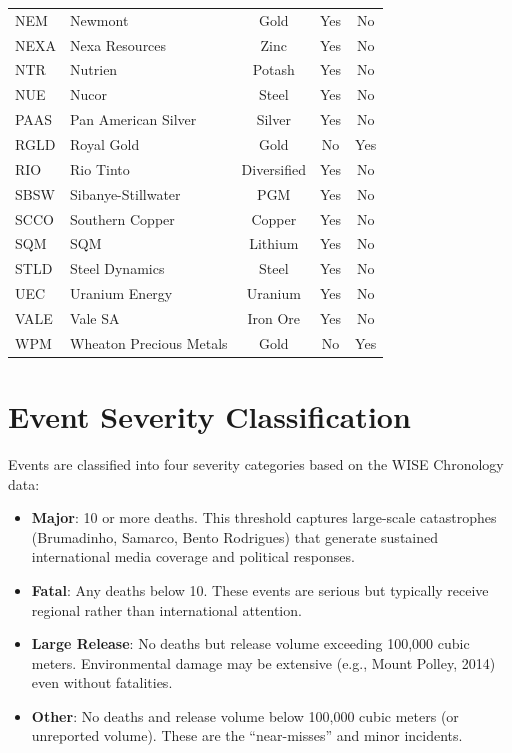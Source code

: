 \documentclass[12pt]{article}
\begin{document}
\begin{table}[htbp]
\begin{tabular}{llccc}
NEM & Newmont & Gold & Yes & No \\
NEXA & Nexa Resources & Zinc & Yes & No \\
NTR & Nutrien & Potash & Yes & No \\
NUE & Nucor & Steel & Yes & No \\
PAAS & Pan American Silver & Silver & Yes & No \\
RGLD & Royal Gold & Gold & No & Yes \\
RIO & Rio Tinto & Diversified & Yes & No \\
SBSW & Sibanye-Stillwater & PGM & Yes & No \\
SCCO & Southern Copper & Copper & Yes & No \\
SQM & SQM & Lithium & Yes & No \\
STLD & Steel Dynamics & Steel & Yes & No \\
UEC & Uranium Energy & Uranium & Yes & No \\
VALE & Vale SA & Iron Ore & Yes & No \\
WPM & Wheaton Precious Metals & Gold & No & Yes \\
\bottomrule
\end{tabular}
\end{table}

\section{Event Severity Classification}\label{app:severity}

Events are classified into four severity categories based on the WISE Chronology data:

\begin{itemize}
\item \textbf{Major}: 10 or more deaths. This threshold captures large-scale catastrophes (Brumadinho, Samarco, Bento Rodrigues) that generate sustained international media coverage and political responses.
\item \textbf{Fatal}: Any deaths below 10. These events are serious but typically receive regional rather than international attention.
\item \textbf{Large Release}: No deaths but release volume exceeding 100,000 cubic meters. Environmental damage may be extensive (e.g., Mount Polley, 2014) even without fatalities.
\item \textbf{Other}: No deaths and release volume below 100,000 cubic meters (or unreported volume). These are the ``near-misses'' and minor incidents.
\end{itemize}
\end{document}
